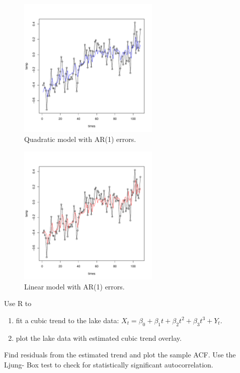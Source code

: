 \documentclass[12pt]{article}
\newenvironment{solution}[2][Solution]{\begin{trivlist}
\item[\hskip \labelsep {\bfseries #1}]}{\end{trivlist}}
\newenvironment{problem}[2][Problem]{\begin{trivlist}
\item[\hskip \labelsep {\bfseries #1}\hskip \labelsep {\bfseries #2.}]}{\end{trivlist}}
\begin{document}
\begin{solution}{}
\vspace*{-4cm}
\begin{figure}
    \centering
    \includegraphics[width=0.6\textwidth]{figs/problem_8/temp_ar1_quad.pdf}
    \vspace*{-0.5cm}
    \caption{Quadratic model with AR(1) errors.}
    \label{fig:temp_ar1_quad}
\end{figure}
\vspace*{-4cm}
\begin{figure}
    \centering
    \includegraphics[width=0.6\textwidth]{figs/problem_8/temp_ar1_lin.pdf}
    \vspace*{-0.5cm}
    \caption{Linear model with AR(1) errors.}
    \label{fig:temp_ar1_lin}
\end{figure}


\end{solution}
\pagebreak

\begin{problem}{9}
Use R to
\begin{enumerate}[label=(\alph*)]
    \item fit a cubic trend to the lake data: $X_t=\beta_0+\beta_1t+\beta_2t^2+\beta_3t^3+Y_t$.
    \item plot the lake data with estimated cubic trend overlay.
\end{enumerate}
Find residuals from the estimated trend and plot the sample ACF. Use the Ljung- Box test to check for statistically significant autocorrelation. 
\end{problem}
\end{document}
